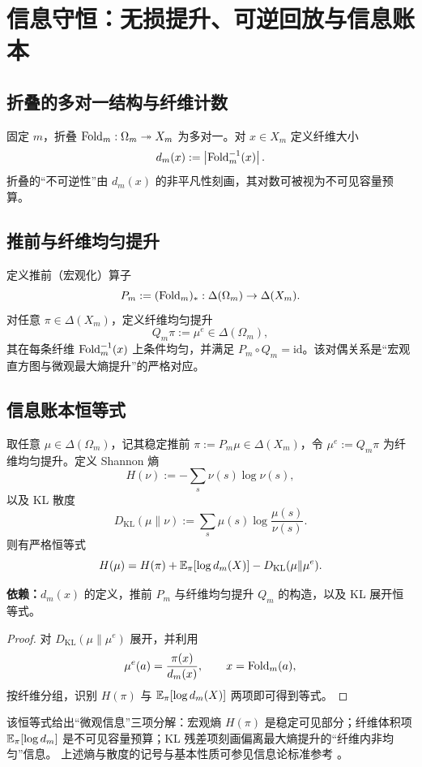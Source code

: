 \section{信息守恒：无损提升、可逆回放与信息账本}\label{sec:ledger}

\subsection{折叠的多对一结构与纤维计数}
固定 $m$，折叠 $\mathrm{Fold}_m:\Omega_m\twoheadrightarrow X_m$ 为多对一。对 $x\in X_m$ 定义纤维大小
$$
d_m(x):=\left\lvert \mathrm{Fold}_m^{-1}(x)\right\rvert.
$$
折叠的“不可逆性”由 $d_m(x)$ 的非平凡性刻画，其对数可被视为不可见容量预算。

\subsection{推前与纤维均匀提升}
定义推前（宏观化）算子
$$
P_m := (\mathrm{Fold}_m)_*:\Delta(\Omega_m)\to \Delta(X_m).
$$
对任意 $\pi\in\Delta(X_m)$，定义纤维均匀提升
$$
Q_m\pi := \mu^e\in\Delta(\Omega_m),
$$
其在每条纤维 $\mathrm{Fold}_m^{-1}(x)$ 上条件均匀，并满足 $P_m\circ Q_m=\mathrm{id}$。该对偶关系是“宏观直方图与微观最大熵提升”的严格对应。

\subsection{信息账本恒等式}
\begin{theorem}[信息账本恒等式]\label{thm:ledger-identity}
取任意 $\mu\in\Delta(\Omega_m)$，记其稳定推前 $\pi:=P_m\mu \in \Delta(X_m)$，令 $\mu^e:=Q_m\pi$ 为纤维均匀提升。定义 Shannon 熵
$$
H(\nu):=-\sum_{s} \nu(s)\log \nu(s),
$$
以及 KL 散度
$$
D_{\mathrm{KL}}(\mu\|\nu):=\sum_{s} \mu(s)\log\frac{\mu(s)}{\nu(s)}.
$$
则有严格恒等式
$$
H(\mu)=H(\pi)+\mathbb{E}_{\pi}[\log d_m(X)]-D_{\mathrm{KL}}(\mu\|\mu^e).
$$
\par\noindent\textnormal{\textbf{依赖：}$d_m(x)$ 的定义，推前 $P_m$ 与纤维均匀提升 $Q_m$ 的构造，以及 KL 展开恒等式。}
\end{theorem}

\begin{proof}
对 $D_{\mathrm{KL}}(\mu\|\mu^e)$ 展开，并利用
$$
\mu^e(a)=\frac{\pi(x)}{d_m(x)},\qquad x=\mathrm{Fold}_m(a),
$$
按纤维分组，识别 $H(\pi)$ 与 $\mathbb{E}_\pi[\log d_m(X)]$ 两项即可得到等式。
\end{proof}

该恒等式给出“微观信息”三项分解：宏观熵 $H(\pi)$ 是稳定可见部分；纤维体积项 $\mathbb{E}_\pi[\log d_m]$ 是不可见容量预算；KL 残差项刻画偏离最大熵提升的“纤维内非均匀”信息。
上述熵与散度的记号与基本性质可参见信息论标准参考 \cite{CoverThomas2006}。


